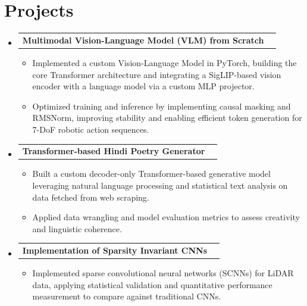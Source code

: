 \documentclass[letterpaper,11pt]{article}
\makeatletter
\newcommand{\resumeItem}[1]{
  \item\normalsize{
    {#1 \vspace{0pt}}
  }
}
\newcommand{\resumeProjectHeading}[2]{
    \vspace{-2pt}\item
    \begin{tabular*}{0.97\textwidth}{l@{\extracolsep{\fill}}r}
      \small#1 & #2 \\
    \end{tabular*}\vspace{0pt}
}
\newcommand{\resumeSubHeadingListStart}{\begin{itemize}}
\newcommand{\resumeSubHeadingListEnd}{\end{itemize}\vspace{0pt}}
\newcommand{\resumeItemListStart}{\begin{itemize}}
\newcommand{\resumeItemListEnd}{\end{itemize}\vspace{0pt}}
\makeatother
\begin{document}
\section{Projects}
\resumeSubHeadingListStart
\resumeProjectHeading
{\textbf{Multimodal Vision-Language Model (VLM) from Scratch}}{}
\resumeItemListStart
\resumeItem{Implemented a custom Vision-Language Model in PyTorch, building the core Transformer architecture and integrating a SigLIP-based vision encoder with a language model via a custom MLP projector.}
\resumeItem{Optimized training and inference by implementing causal masking and RMSNorm, improving stability and enabling efficient token generation for 7-DoF robotic action sequences.}
\resumeItemListEnd
\resumeProjectHeading
{\textbf{Transformer-based Hindi Poetry Generator}}{}
\resumeItemListStart
\resumeItem{Built a custom decoder-only Transformer-based generative model leveraging natural language processing and statistical text analysis on data fetched from web scraping.}
\resumeItem{Applied data wrangling and model evaluation metrics to assess creativity and linguistic coherence.}
\resumeItemListEnd
\resumeProjectHeading
{\textbf{Implementation of Sparsity Invariant CNNs}}{}
\resumeItemListStart
\resumeItem{Implemented sparse convolutional neural networks (SCNNs) for LiDAR data, applying statistical validation and quantitative performance measurement to compare against traditional CNNs.}
\resumeItemListEnd
\resumeSubHeadingListEnd
\end{document}
